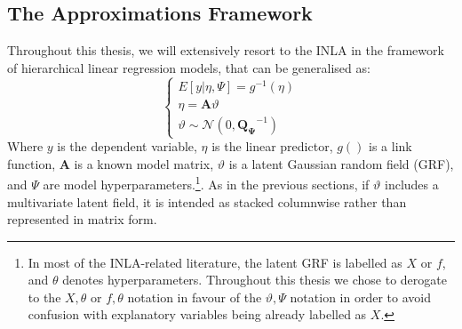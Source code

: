 \documentclass[openany, 11pt, oneside]{book}
\begin{document}
\subsection{The Approximations Framework}\label{subsection:approximations}


Throughout this thesis, we will extensively resort to the INLA in the framework of hierarchical linear regression models, that can be generalised as:
%
$$
\left\{ \begin{array}{ll} 
E[y\vert \eta, \Psi] = g^{-1}(\eta)\\
\eta = \boldsymbol{A} \vartheta \\
\vartheta \sim\mathcal{N}\left(0, \boldsymbol{Q_\Psi}^{-1} \right)
\end{array} \right. 
$$
%
Where $y$ is the dependent variable, $\eta$ is the linear predictor, $g()$ is a link function, $\boldsymbol{A}$ is a known model matrix, $\vartheta$ is a latent Gaussian random field (GRF), and $\Psi$ are model hyperparameters.\footnote{In most of the INLA-related literature, the latent GRF is labelled as $X$ or $f$, and $\theta$ denotes hyperparameters. Throughout this thesis we chose to derogate to the $X, \theta $ or $f, \theta$ notation in favour of the $\vartheta, \Psi$ notation in order to avoid confusion with explanatory variables being already labelled as $X$.}. As in the previous sections, if $\vartheta$ includes a multivariate latent field, it is intended as stacked columnwise rather than represented in matrix form.
\end{document}
